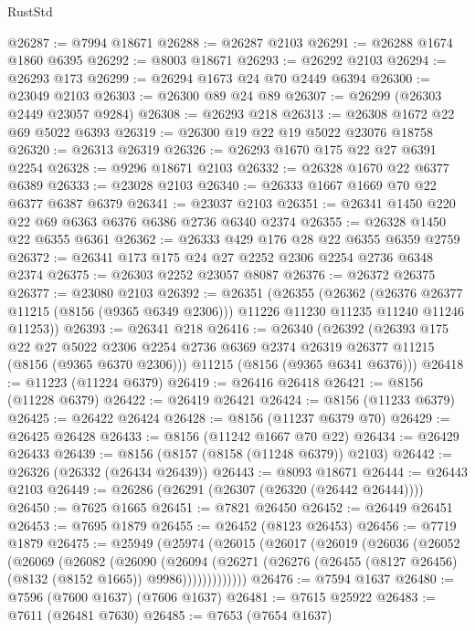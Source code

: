 \begin{lexlean}{RustStd}
\begin{coremodule}
@26287 := @7994 @18671
@26288 := @26287 @2103
@26291 := @26288 @1674 @1860 @6395
@26292 := @8003 @18671
@26293 := @26292 @2103
@26294 := @26293 @173
@26299 := @26294 @1673 @24 @70 @2449 @6394
@26300 := @23049 @2103
@26303 := @26300 @89 @24 @89
@26307 := @26299 (@26303 @2449 @23057 @9284)
@26308 := @26293 @218
@26313 := @26308 @1672 @22 @69 @5022 @6393
@26319 := @26300 @19 @22 @19 @5022 @23076 @18758
@26320 := @26313 @26319
@26326 := @26293 @1670 @175 @22 @27 @6391 @2254
@26328 := @9296 @18671 @2103
@26332 := @26328 @1670 @22 @6377 @6389
@26333 := @23028 @2103
@26340 := @26333 @1667 @1669 @70 @22 @6377 @6387 @6379
@26341 := @23037 @2103
@26351 := @26341 @1450 @220 @22 @69 @6363 @6376 @6386 @2736 @6340 @2374
@26355 := @26328 @1450 @22 @6355 @6361
@26362 := @26333 @429 @176 @28 @22 @6355 @6359 @2759
@26372 := @26341 @173 @175 @24 @27 @2252 @2306 @2254 @2736 @6348 @2374
@26375 := @26303 @2252 @23057 @8087
@26376 := @26372 @26375
@26377 := @23080 @2103
@26392 := @26351
    (@26355
      (@26362
        (@26376 @26377 @11215 (@8156 (@9365 @6349 @2306)))
        @11226
        @11230
        @11235
        @11240
        @11246
        @11253))
@26393 := @26341 @218
@26416 := @26340
    (@26392
      (@26393
        @175
        @22
        @27
        @5022
        @2306
        @2254
        @2736
        @6369
        @2374
        @26319
        @26377
        @11215
        (@8156 (@9365 @6370 @2306)))
      @11215
      (@8156 (@9365 @6341 @6376)))
@26418 := @11223 (@11224 @6379)
@26419 := @26416 @26418
@26421 := @8156 (@11228 @6379)
@26422 := @26419 @26421
@26424 := @8156 (@11233 @6379)
@26425 := @26422 @26424
@26428 := @8156 (@11237 @6379 @70)
@26429 := @26425 @26428
@26433 := @8156 (@11242 @1667 @70 @22)
@26434 := @26429 @26433
@26439 := @8156 (@8157 (@8158 (@11248 @6379)) @2103)
@26442 := @26326 (@26332 (@26434 @26439))
@26443 := @8093 @18671
@26444 := @26443 @2103
@26449 := @26286 (@26291 (@26307 (@26320 (@26442 @26444))))
@26450 := @7625 @1665
@26451 := @7821 @26450
@26452 := @26449 @26451
@26453 := @7695 @1879
@26455 := @26452 (@8123 @26453)
@26456 := @7719 @1879
@26475 := @25949
    (@25974
      (@26015
        (@26017
          (@26019
            (@26036
              (@26052
                (@26069
                  (@26082
                    (@26090
                      (@26094
                        (@26271
                          (@26276 (@26455 (@8127 @26456) (@8132 (@8152 @1665)) @9986)))))))))))))
@26476 := @7594 @1637
@26480 := @7596 (@7600 @1637) (@7606 @1637)
@26481 := @7615 @25922
@26483 := @7611 (@26481 @7630)
@26485 := @7653 (@7654 @1637)

\end{coremodule}
\end{lexlean}
